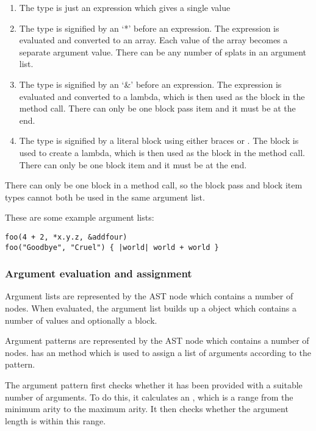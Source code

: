 \begin{enumerate}
  \item The  type is just an expression which gives a single value
  \item The  type is signified by an `*' before an expression. The expression is evaluated and converted to an array. Each value of the array becomes a separate argument value. There can be any number of splats in an argument list.
  \item The  type is signified by an `\&' before an expression. The expression is evaluated and converted to a lambda, which is then used as the block in the method call. There can only be one block pass item and it must be at the end.
  \item The  type is signified by a literal block using either braces or   . The block is used to create a lambda, which is then used as the block in the method call. There can only be one block item and it must be at the end.
\end{enumerate}

There can only be one block in a method call, so the block pass and block item types cannot both be used in the same argument list.

These are some example argument lists:

\begin{lstlisting}
foo(4 + 2, *x.y.z, &addfour)
foo("Goodbye", "Cruel") { |world| world + world }
\end{lstlisting}

\subsubsection{Argument evaluation and assignment}

Argument lists are represented by the  AST node which contains a number of \-\- nodes. When evaluated, the argument list builds up a  object which contains a number of values and optionally a block.

Argument patterns are represented by the  AST node which contains a number of \-\- nodes.  has an  method which is used to assign a list of arguments according to the pattern.

The argument pattern first checks whether it has been provided with a suitable number of arguments. To do this, it calculates an , which is a range from the minimum arity to the maximum arity. It then checks whether the argument length is within this range.

